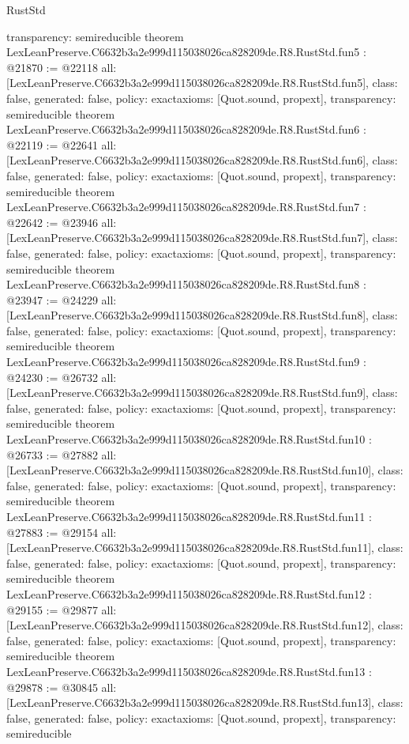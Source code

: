 \begin{lexlean}{RustStd}
\begin{coremodule}
{  transparency: semireducible
}
theorem LexLeanPreserve.C6632b3a2e999d115038026ca828209de.R8.RustStd.fun5 : @21870 := @22118 {
  all: [LexLeanPreserve.C6632b3a2e999d115038026ca828209de.R8.RustStd.fun5],
  class: false,
  generated: false,
  policy: exact{axioms: [Quot.sound, propext]},
  transparency: semireducible
}
theorem LexLeanPreserve.C6632b3a2e999d115038026ca828209de.R8.RustStd.fun6 : @22119 := @22641 {
  all: [LexLeanPreserve.C6632b3a2e999d115038026ca828209de.R8.RustStd.fun6],
  class: false,
  generated: false,
  policy: exact{axioms: [Quot.sound, propext]},
  transparency: semireducible
}
theorem LexLeanPreserve.C6632b3a2e999d115038026ca828209de.R8.RustStd.fun7 : @22642 := @23946 {
  all: [LexLeanPreserve.C6632b3a2e999d115038026ca828209de.R8.RustStd.fun7],
  class: false,
  generated: false,
  policy: exact{axioms: [Quot.sound, propext]},
  transparency: semireducible
}
theorem LexLeanPreserve.C6632b3a2e999d115038026ca828209de.R8.RustStd.fun8 : @23947 := @24229 {
  all: [LexLeanPreserve.C6632b3a2e999d115038026ca828209de.R8.RustStd.fun8],
  class: false,
  generated: false,
  policy: exact{axioms: [Quot.sound, propext]},
  transparency: semireducible
}
theorem LexLeanPreserve.C6632b3a2e999d115038026ca828209de.R8.RustStd.fun9 : @24230 := @26732 {
  all: [LexLeanPreserve.C6632b3a2e999d115038026ca828209de.R8.RustStd.fun9],
  class: false,
  generated: false,
  policy: exact{axioms: [Quot.sound, propext]},
  transparency: semireducible
}
theorem LexLeanPreserve.C6632b3a2e999d115038026ca828209de.R8.RustStd.fun10 : @26733 := @27882 {
  all: [LexLeanPreserve.C6632b3a2e999d115038026ca828209de.R8.RustStd.fun10],
  class: false,
  generated: false,
  policy: exact{axioms: [Quot.sound, propext]},
  transparency: semireducible
}
theorem LexLeanPreserve.C6632b3a2e999d115038026ca828209de.R8.RustStd.fun11 : @27883 := @29154 {
  all: [LexLeanPreserve.C6632b3a2e999d115038026ca828209de.R8.RustStd.fun11],
  class: false,
  generated: false,
  policy: exact{axioms: [Quot.sound, propext]},
  transparency: semireducible
}
theorem LexLeanPreserve.C6632b3a2e999d115038026ca828209de.R8.RustStd.fun12 : @29155 := @29877 {
  all: [LexLeanPreserve.C6632b3a2e999d115038026ca828209de.R8.RustStd.fun12],
  class: false,
  generated: false,
  policy: exact{axioms: [Quot.sound, propext]},
  transparency: semireducible
}
theorem LexLeanPreserve.C6632b3a2e999d115038026ca828209de.R8.RustStd.fun13 : @29878 := @30845 {
  all: [LexLeanPreserve.C6632b3a2e999d115038026ca828209de.R8.RustStd.fun13],
  class: false,
  generated: false,
  policy: exact{axioms: [Quot.sound, propext]},
  transparency: semireducible
}
\end{coremodule}
\end{lexlean}
